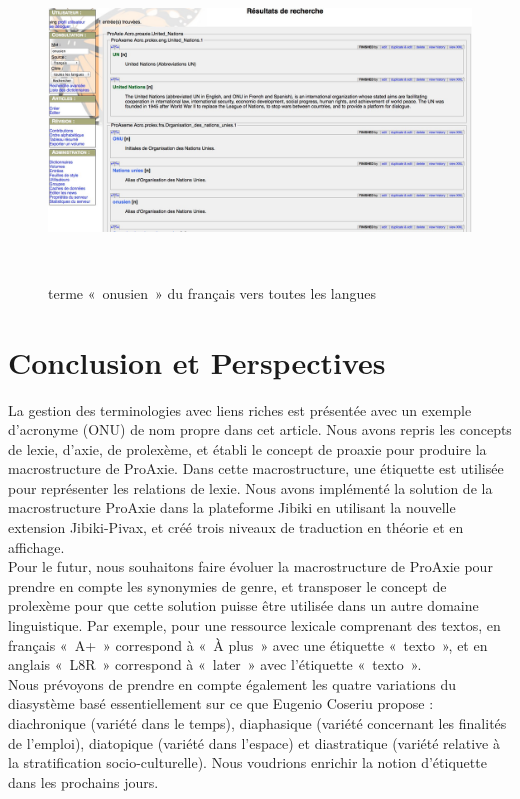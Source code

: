 \documentclass[10pt,a4paper,twoside]{article}
\begin{document}
\begin{figure}[htbp] 
\begin{center} 
\includegraphics[width=14cm]{images/scenario3.jpg}
\end{center} 
\caption{terme « onusien » du français vers toutes les langues} \label{image-scenario3} \
\end{figure}

\section{Conclusion et Perspectives}
La gestion des terminologies avec liens riches est présentée avec un exemple d'acronyme (ONU) de nom propre dans cet article. Nous avons repris les concepts de lexie, d'axie, de prolexème,  et établi le concept de proaxie pour produire la macrostructure de ProAxie. Dans cette macrostructure, une étiquette est utilisée pour représenter les relations de lexie. Nous avons implémenté la solution de la macrostructure ProAxie dans la plateforme Jibiki en utilisant la nouvelle extension Jibiki-Pivax, et créé trois niveaux de traduction en théorie et en affichage.  \\
Pour le futur, nous souhaitons faire évoluer la macrostructure de ProAxie pour prendre en compte les synonymies de genre, et transposer le concept de prolexème pour que cette solution puisse être utilisée dans un autre domaine linguistique. Par exemple, pour une ressource lexicale comprenant des textos, en français « A+ » correspond à « À plus » avec une étiquette « texto », et en anglais « L8R » correspond à « later » avec l’étiquette « texto ».  \\
Nous prévoyons de prendre en compte également les quatre variations du diasystème basé essentiellement sur ce que Eugenio Coseriu propose : diachronique (variété dans le temps), diaphasique (variété concernant les finalités de l'emploi), diatopique (variété dans l'espace) et diastratique (variété relative à la stratification socio-culturelle). Nous voudrions enrichir la notion d'étiquette dans les prochains jours.
\end{document}
